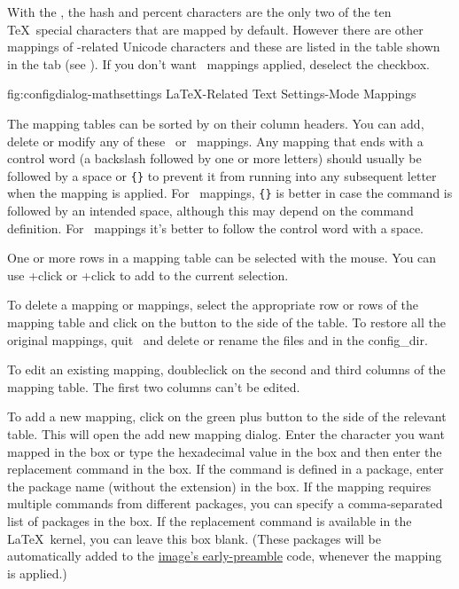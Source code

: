 With the \mathstool, the \gls{hash} and \gls{percent} characters are the
only two of the ten \TeX\ special characters that are mapped by
default. However there are other mappings of -related Unicode
characters and these are listed in the table shown in the
 tab (see
). If you don't want
\mathsmode\ mappings applied, deselect the
 \gls*{checkbox}.

\FloatFig
  {fig:configdialog-mathsettings}
  {}
  {LaTeX-Related Text Settings\dash {}-Mode Mappings}

The mapping tables can be sorted by  on
their column headers. You can add, delete or modify any of these
\textmode\ or \mathsmode\ mappings. Any mapping that ends with a control
word (a backslash followed by one or more letters) should
usually be followed by a space or \verb|{}| to prevent it from
running into any subsequent letter when the mapping is applied. For
\textmode\ mappings, \verb|{}| is better in case the command is
followed by an intended space, although this may depend on the
command definition. For \mathsmode\ mappings it's better
to follow the control word with a space.

One or more rows in a mapping table can be selected with the mouse.
You can use +\gls{click} or 
+\gls{click} to add to the
current selection.


To delete a mapping or mappings, select the appropriate row or rows of the
mapping table and click on the  button
to the side of the table.  To restore all the original mappings,
quit \FlowframTk\ and delete or rename the files
 and  in the
\gls{config_dir}.

To edit an existing mapping, \gls{doubleclick} on the second and
third columns of the mapping table. The first two columns can't be
edited.

To add a new mapping, \gls{click} on the green plus button to the
side of the relevant table.  This will open the add new mapping
dialog. Enter the character you want mapped in the
 box or type the hexadecimal value in the
 box and then enter the replacement
command in the  box.  If the command is
defined in a package, enter the package name (without the 
extension) in the  box. If the mapping
requires multiple commands from different packages, you can specify
a comma-separated list of packages in the
 box. If the replacement command is
available in the \LaTeX\ kernel, you can leave this box blank.
(These packages will be automatically added to the
\hyperref[sec:preamble]{image's early-preamble} code, whenever the
mapping is applied.)

